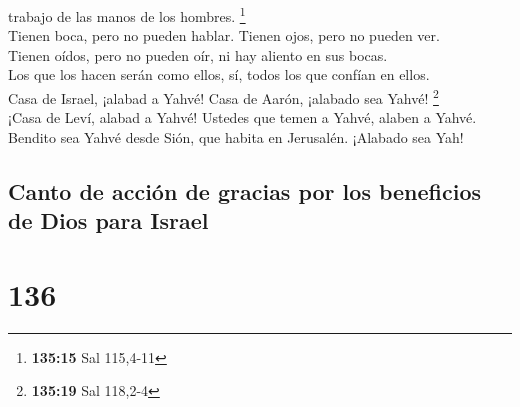 trabajo de las manos de los hombres. \footnote{\textbf{135:15} Sal
  115,4-11}\\
 Tienen boca, pero no pueden hablar. Tienen ojos, pero no
pueden ver.\\
 Tienen oídos, pero no pueden oír, ni hay aliento en sus
bocas.\\
 Los que los hacen serán como ellos, sí, todos los que
confían en ellos.\\
 Casa de Israel, ¡alabad a Yahvé! Casa de Aarón, ¡alabado
sea Yahvé! \footnote{\textbf{135:19} Sal 118,2-4}\\
 ¡Casa de Leví, alabad a Yahvé! Ustedes que temen a
Yahvé, alaben a Yahvé.\\
 Bendito sea Yahvé desde Sión, que habita en Jerusalén.
¡Alabado sea Yah!

\hypertarget{canto-de-acciuxf3n-de-gracias-por-los-beneficios-de-dios-para-israel}{%
\subsection{Canto de acción de gracias por los beneficios de Dios para
Israel}\label{canto-de-acciuxf3n-de-gracias-por-los-beneficios-de-dios-para-israel}}

\hypertarget{section-133}{%
\section{136}\label{section-133}}

